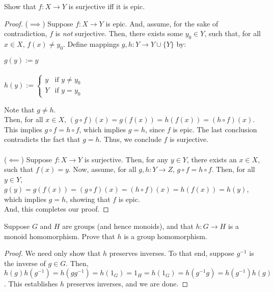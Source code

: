 \documentclass[]{amsbook}
\begin{document}
\setcounter{Exercise}{1}
\begin{Exercise}
	Show that $f: X \to Y$ is surjective iff it is epic.
\end{Exercise}
\begin{proof}
	($\implies$) Suppose $f: X \to Y$ is epic. And, assume, for the sake of contradiction,
	$f$ is \emph{not} surjective. Then, there exists some $y_0 \in Y$, such
	that, for all $x \in X$, $f(x) \ne y_0$. Define mappings $g, h: Y \to Y \cup \{ Y \}$
	by:
	\begin{center}
		$g(y) := y$\\~\\
		$h(y) :=
		\begin{cases}
		y & \text{if } y \ne y_0 \\
		Y & \text{if } y = y_0
		\end{cases}$
	\end{center}
	Note that $g \ne h$.\\
	Then, for all $x \in X$, $(g \circ f)(x) = g(f(x)) = h(f(x)) = (h \circ f)(x)$.
	This implies $g \circ f = h \circ f$, which implies $g = h$, since $f$ is
	epic. The last conclusion contradicts the fact that $g = h$. Thus, we
	conclude $f$ is	surjective.\\~\\
	($\impliedby$) Suppose $f: X \to Y$ is surjective. Then, for any $y \in Y$,
	there exists an $x \in X$, such that $f(x) = y$. Now, assume, for all
	$g, h: Y \to Z$, $g \circ f = h \circ f$. Then, for all $y \in Y$,
	$g(y) = g(f(x)) = (g \circ f)(x) = (h \circ f)(x) = h(f(x)) = h(y)$, which
	implies $g = h$, showing that $f$ is epic.\\
	And, this completes our proof.
\end{proof}

\setcounter{Exercise}{4}
\begin{Exercise}
	Suppose $G$ and $H$ are groups (and hence monoids), and that $h: G \to H$
	is a monoid homomorphism. Prove that $h$ is a group homomorphism.
\end{Exercise}
\begin{proof}
	We need only show that $h$ preserves inverses. To that end,
	suppose $g^{-1}$ is the inverse of $g \in G$. Then, $h(g) h(g^{-1}) =
	h(g g^{-1}) = h(1_G) = 1_H = h(1_G) = h(g^{-1} g) = h(g^{-1}) h(g)$.
	This establishes $h$ preserves inverses, and we are done.
\end{proof}
\end{document}

